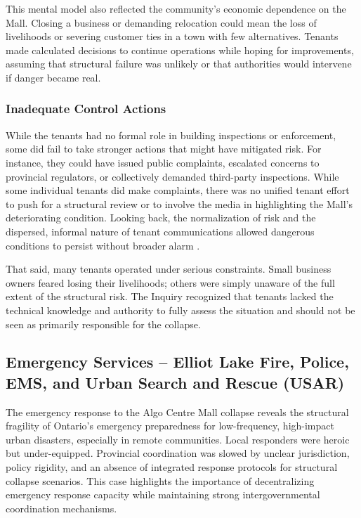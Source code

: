 \documentclass[12pt]{article}
\begin{document}
This mental model also reflected the community’s economic dependence on the Mall. Closing a business or demanding relocation could mean the loss of livelihoods or severing customer ties in a town with few alternatives. Tenants made calculated decisions to continue operations while hoping for improvements, assuming that structural failure was unlikely or that authorities would intervene if danger became real.

\subsubsection*{Inadequate Control Actions}

While the tenants had no formal role in building inspections or enforcement, some did fail to take stronger actions that might have mitigated risk. For instance, they could have issued public complaints, escalated concerns to provincial regulators, or collectively demanded third-party inspections. While some individual tenants did make complaints, there was no unified tenant effort to push for a structural review or to involve the media in highlighting the Mall’s deteriorating condition. Looking back, the normalization of risk and the dispersed, informal nature of tenant communications allowed dangerous conditions to persist without broader alarm \cite[p250–251]{AlgoLakeReport1}.

That said, many tenants operated under serious constraints. Small business owners feared losing their livelihoods; others were simply unaware of the full extent of the structural risk. The Inquiry recognized that tenants lacked the technical knowledge and authority to fully assess the situation and should not be seen as primarily responsible for the collapse.

\subsection{Emergency Services – Elliot Lake Fire, Police, EMS, and Urban Search and Rescue (USAR)}
The emergency response to the Algo Centre Mall collapse reveals the structural fragility of Ontario’s emergency preparedness for low-frequency, high-impact urban disasters, especially in remote communities. Local responders were heroic but under-equipped. Provincial coordination was slowed by unclear jurisdiction, policy rigidity, and an absence of integrated response protocols for structural collapse scenarios. This case highlights the importance of decentralizing emergency response capacity while maintaining strong intergovernmental coordination mechanisms.
\end{document}
